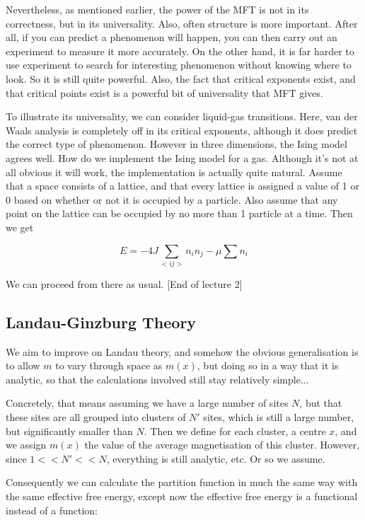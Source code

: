 \documentclass{article}
\theoremstyle{definition}
\begin{document}
Nevertheless, as mentioned earlier, the power of the MFT is not in its
correctness, but in its universality. Also, often structure is more important.
After all, if you can predict a phenomenon will happen, you can then carry out
an experiment to measure it more accurately. On the other hand, it is far harder
to use experiment to search for interesting phenomenon without knowing where to
look. So it is still quite powerful. Also, the fact that critical
exponents exist, and that critical points exist is a powerful bit of
universality that MFT gives.

To illustrate its universality, we can consider liquid-gas transitions. Here,
van der Waals analysis is completely off in its critical exponents, although it
does predict the correct type of phenomenon. However in three dimensions, the
Ising model agrees well. How do we implement the Ising model for a gas. Although
it's not at all obvious it will work, the implementation is actually quite
natural. Assume that a space consists of a lattice, and that every lattice is
assigned a value of 1 or 0 based on whether or not it is occupied by a particle.
Also assume that any point on the lattice can be occupied by no more than 1
particle at a time. Then we get

$$ E = -4J \sum_{<i j>} n_i n_j - \mu \sum n_i $$

We can proceed from there as usual. [End of lecture 2]

\subsection{Landau-Ginzburg Theory}

We aim to improve on Landau theory, and somehow the obvious generalisation is to
allow $m$ to vary through space as $m(x)$, but doing so in a way that it is
analytic, so that the calculations involved still stay relatively simple...

Concretely, that means assuming we have a large number of sites $N$, but that
these sites are all grouped into clusters of $N'$ sites, which is still a large
number, but significantly smaller than $N$. Then we define for each cluster, a
centre $x$, and we assign $m(x)$ the value of the average magnetisation of this
cluster. However, since $1 << N' << N$, everything is still analytic, etc. Or so
we assume.

Consequently we can calculate the partition function in much the same way with
the same effective free energy, except now the effective free energy is a
functional instead of a function:
\end{document}
